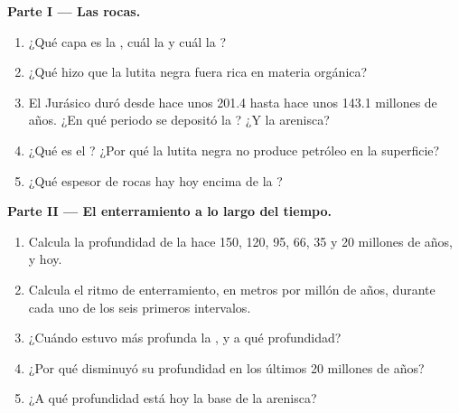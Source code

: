 \begin{problem}
\medskip
\noindent\textbf{Parte I --- Las rocas.}
\begin{enumerate}
  \item ¿Qué capa es la , cuál la  y cuál la ?
  \item ¿Qué hizo que la lutita negra fuera rica en materia orgánica?
  \item El Jurásico duró desde hace unos \num{201.4} hasta hace unos \num{143.1}
        millones de años. ¿En qué periodo se depositó la ? ¿Y
        la arenisca?
  \item ¿Qué es el ? ¿Por qué la lutita negra no produce petróleo en
        la superficie?
  \item ¿Qué espesor de rocas hay hoy encima de la ?
\end{enumerate}

\medskip
\noindent\textbf{Parte II --- El enterramiento a lo largo del tiempo.}
\begin{enumerate}[resume]
  \item Calcula la profundidad de la  hace 150, 120, 95, 66, 35
        y 20 millones de años, y hoy.
  \item Calcula el ritmo de enterramiento, en metros por millón de años,
        durante cada uno de los seis primeros intervalos.
  \item ¿Cuándo estuvo más profunda la , y a qué profundidad?
  \item ¿Por qué disminuyó su profundidad en los últimos 20 millones de años?
  \item ¿A qué profundidad está hoy la base de la arenisca?
\end{enumerate}


\end{problem}
